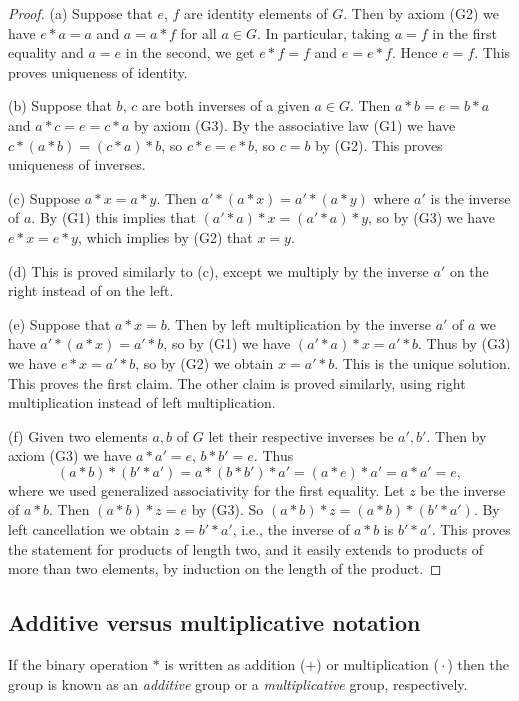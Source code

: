 \documentclass[11pt]{article}
\theoremstyle{definition}
\begin{document}
\begin{proof} 
(a) Suppose that $e$, $f$ are identity elements of $G$. Then by
  axiom (G2) we have $e*a=a$ and $a=a*f$ for all $a\in G$. In
  particular, taking $a=f$ in the first equality and $a=e$ in the
  second, we get $e*f=f$ and $e=e*f$. Hence $e=f$. This proves
  uniqueness of identity.

(b) Suppose that $b$, $c$ are both inverses of a given $a \in G$. Then
  $a*b=e=b*a$ and $a*c=e=c*a$ by axiom (G3). By the associative law
  (G1) we have $c*(a*b) = (c*a)*b$, so $c*e=e*b$, so $c=b$ by
  (G2). This proves uniqueness of inverses.

(c) Suppose $a*x=a*y$. Then $a'*(a*x) = a'*(a*y)$ where $a'$ is the
  inverse of $a$. By (G1) this implies that $(a'*a)*x = (a'*a)*y$, so
  by (G3) we have $e*x = e*y$, which implies by (G2) that $x=y$.


(d) This is proved similarly to (c), except we multiply by the
  inverse $a'$ on the right instead of on the left.

(e) Suppose that $a*x=b$. Then by left multiplication by the inverse
  $a'$ of $a$ we have $a'*(a*x) = a'*b$, so by (G1) we have $(a'*a)*x
  = a'*b$. Thus by (G3) we have $e*x = a'*b$, so by (G2) we obtain $x
  = a'*b$. This is the unique solution.  This proves the first
  claim. The other claim is proved similarly, using right
  multiplication instead of left multiplication.

(f) Given two elements $a,b$ of $G$ let their respective inverses be
  $a',b'$. Then by axiom (G3) we have $a*a'=e$, $b*b'=e$. Thus 
  \[
    (a*b)*(b'*a') = a*(b*b')*a' = (a*e)*a' = a*a' = e,
  \]
  where we used generalized associativity for the first equality. Let
  $z$ be the inverse of $a*b$. Then $(a*b)*z = e$ by (G3). So $(a*b)*z
  = (a*b)*(b'*a')$. By left cancellation we obtain $z = b'*a'$, i.e.,
  the inverse of $a*b$ is $b'*a'$. This proves the statement for
  products of length two, and it easily extends to products of more
  than two elements, by induction on the length of the product.
\end{proof}



\subsection*{Additive versus multiplicative notation}
%
If the binary operation $*$ is written as addition ($+$) or
multiplication (\,$\cdot$\,) then the group is known as an \emph{additive}
group or a \emph{multiplicative} group, respectively.
\end{document}

